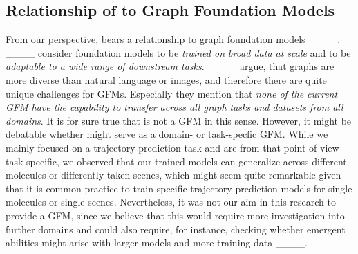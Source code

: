 \subsection{Relationship of \ourMethod to Graph Foundation Models}
From our perspective, \ourMethod bears a relationship to graph foundation models ____. ____ consider foundation models to be \textit{trained on broad data at scale} and to be \textit{adaptable to a wide range of downstream tasks}. ____ argue, that graphs are more diverse than natural language or images, and therefore there are quite unique challenges for GFMs. Especially they mention that \textit{ none of the current GFM have the capability to transfer across all graph tasks and datasets from all domains}. It is for sure true that \ourMethod is not a GFM in this sense. However, it might be debatable whether \ourMethod might serve as a domain- or task-specfic GFM. While we mainly focused on a trajectory prediction task and are from that point of view task-specific, we observed that our trained models can generalize across different molecules or differently taken scenes, which might seem quite remarkable given that it is common practice to train specific trajectory prediction models for single molecules or single scenes. Nevertheless, it was not our aim in this research to provide a GFM, since we believe that this would require more investigation into further domains and could also require, for instance, checking whether emergent abilities might arise with larger models and more training data ____.









\clearpage